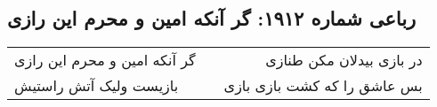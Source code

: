 \begin{center}
\section*{رباعی شماره ۱۹۱۲: گر آنکه امین و محرم این رازی}
\label{sec:1912}
\begin{longtable}{l p{0.5cm} r}
گر آنکه امین و محرم این رازی
&&
در بازی بیدلان مکن طنازی
\\
بازیست ولیک آتش راستیش
&&
بس عاشق را که کشت بازی بازی
\\
\end{longtable}
\end{center}
